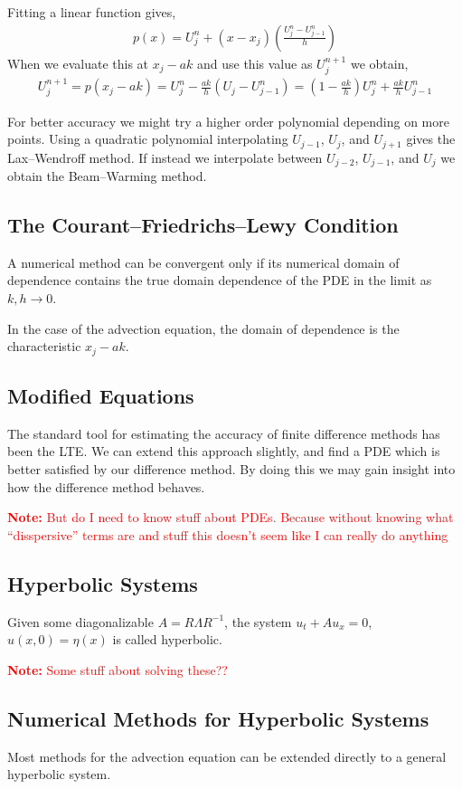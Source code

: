 \documentclass[12pt]{article}
\newcommand{\note}[1]{\textcolor{red}{\textbf{Note:} #1}}
\begin{document}
Fitting a linear function gives,
\begin{align*}
    p(x) = U_j^n + (x-x_j) \left( \frac{U_j^n-U_{j-1}^n}{h} \right)
\end{align*}
When we evaluate this at \( x_j - ak \) and use this value as \( U_j^{n+1} \) we obtain,
\begin{align*}
    U_j^{n+1} = p(x_j-ak) = U_j^n - \frac{ak}{h} (U_j-U_{j-1}^n) = \left( 1-\frac{ak}{h} \right) U_j^n + \frac{ak}{h} U_{j-1}^n
\end{align*}

For better accuracy we might try a higher order polynomial depending on more points. Using a quadratic polynomial interpolating \( U_{j-1} \), \( U_j \), and \( U_{j+1} \) gives the Lax--Wendroff method. If instead we interpolate between \( U_{j-2} \), \( U_{j-1} \), and \( U_j \) we obtain the Beam--Warming method.


\subsection{The Courant--Friedrichs--Lewy Condition}

\begin{theorem}
A numerical method can be convergent only if its numerical domain of dependence contains the true domain dependence of the PDE in the limit as \( k, h \to 0\).
\end{theorem}

In the case of the advection equation, the domain of dependence is the characteristic \( x_j - ak \).

\subsection{Modified Equations}
The standard tool for estimating the accuracy of finite difference methods has been the LTE. We can extend this approach slightly, and find a PDE which is better satisfied by our difference method. By doing this we may gain insight into how the difference method behaves.

\note{But do I need to know stuff about PDEs. Because without knowing what ``disspersive'' terms are and stuff this doesn't seem like I can really do anything}

\subsection{Hyperbolic Systems}
Given some diagonalizable \( A = R\Lambda R^{-1} \), the system \( u_t + Au_x = 0 \), \( u(x,0) = \eta(x) \) is called hyperbolic.

\note{Some stuff about solving these??}

\subsection{Numerical Methods for Hyperbolic Systems}
Most methods for the advection equation can be extended directly to a general hyperbolic system.








\end{document}

